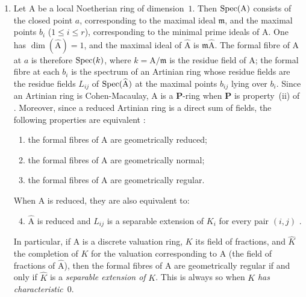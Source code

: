 \begin{remarks}[7.3.19]
\begin{enumerate}[label=(\roman*)]
  \item Let $\mathrm{A}$ be a local Noetherian ring of dimension~$1$.
  Then $\operatorname{Spec}(\mathrm{A})$ consists of the closed point $a$, corresponding to the maximal ideal $\mathfrak{m}$, and the maximal points $b_i$ ($1\leqslant i\leqslant r$), corresponding to the minimal prime ideals of $\mathrm{A}$.
  One has $\dim(\widehat{\mathrm{A}})=1$, and the maximal ideal of $\widehat{\mathrm{A}}$ is $\mathfrak{m}\widehat{\mathrm{A}}$.
  The formal fibre of $\mathrm{A}$ at $a$ is therefore $\operatorname{Spec}(k)$, where $k=\mathrm{A}/\mathfrak{m}$ is the residue field of $\mathrm{A}$; the formal fibre at each $b_i$ is the spectrum of an Artinian ring whose residue fields are the residue fields $L_{ij}$ of $\operatorname{Spec}(\widehat{\mathrm{A}})$ at the maximal points $b_{ij}$ lying over $b_i$.
  Since an Artinian ring is Cohen-Macaulay, $\mathrm{A}$ is a $\boldsymbol{P}$-ring when $\boldsymbol{P}$ is property~(ii) of .
  Moreover, since a reduced Artinian ring is a direct sum of fields, the following properties are equivalent :
  \begin{enumerate}[label=\emph{\alph*)}]
    \item the formal fibres of $\mathrm{A}$ are geometrically reduced;
    \item the formal fibres of $\mathrm{A}$ are geometrically normal;
    \item the formal fibres of $\mathrm{A}$ are geometrically regular.
  \end{enumerate}
  When $\mathrm{A}$ is reduced, they are also equivalent to:
  \begin{enumerate}[label=\emph{\alph*)}]
    \setcounter{enumii}{3}
    \item $\widehat{\mathrm{A}}$ is reduced and $L_{ij}$ is a separable extension of $K_i$ for every pair $(i,j)$ .
  \end{enumerate}
  In particular, if $\mathrm{A}$ is a discrete valuation ring, $K$ its field of fractions, and $\widehat{K}$ the completion of $K$ for the valuation corresponding to $\mathrm{A}$ (the field of fractions of $\widehat{\mathrm{A}}$), then the formal fibres of $\mathrm{A}$ are geometrically regular if and only if $\widehat{K}$ is a \emph{separable extension of} $K$.
  This is always so when $K$ \emph{has characteristic}~$0$.
\end{enumerate}
\end{remarks}


\newpage %
